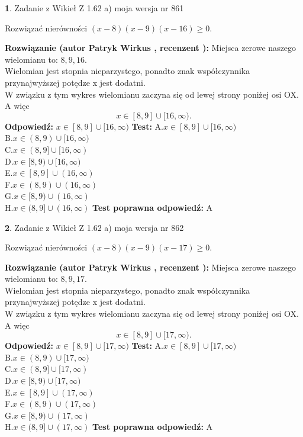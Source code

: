 \documentclass[12pt, a4paper]{article}
\theoremstyle{definition} %
\newtheorem{zad}{}
\newcommand{\zadStart}[1]{\begin{zad}#1\newline}
\newcommand{\zadStop}{\end{zad}}
\newcommand{\rozwStart}[2]{\noindent \textbf{Rozwiązanie (autor #1 , recenzent #2): }\newline}
\newcommand{\rozwStop}{\newline}
\newcommand{\odpStart}{\noindent \textbf{Odpowiedź:}\newline}
\newcommand{\odpStop}{\newline}
\newcommand{\testStart}{\noindent \textbf{Test:}\newline}
\newcommand{\testStop}{\newline}
\newcommand{\kluczStart}{\noindent \textbf{Test poprawna odpowiedź:}\newline}
\newcommand{\kluczStop}{\newline}
\begin{document}
\zadStart{Zadanie z Wikieł Z 1.62 a) moja wersja nr 861}

Rozwiązać nierówności $(x-8)(x-9)(x-16)\ge0$.
\zadStop
\rozwStart{Patryk Wirkus}{}
Miejsca zerowe naszego wielomianu to: $8, 9, 16$.\\
Wielomian jest stopnia nieparzystego, ponadto znak współczynnika przy\linebreak najwyższej potędze x jest dodatni.\\ W związku z tym wykres wielomianu zaczyna się od lewej strony poniżej osi OX. A więc $$x \in [8,9] \cup [16,\infty).$$
\rozwStop
\odpStart
$x \in [8,9] \cup [16,\infty)$
\odpStop
\testStart
A.$x \in [8,9] \cup [16,\infty)$\\
B.$x \in (8,9) \cup [16,\infty)$\\
C.$x \in (8,9] \cup [16,\infty)$\\
D.$x \in [8,9) \cup [16,\infty)$\\
E.$x \in [8,9] \cup (16,\infty)$\\
F.$x \in (8,9) \cup (16,\infty)$\\
G.$x \in [8,9) \cup (16,\infty)$\\
H.$x \in (8,9] \cup (16,\infty)$
\testStop
\kluczStart
A
\kluczStop



\zadStart{Zadanie z Wikieł Z 1.62 a) moja wersja nr 862}

Rozwiązać nierówności $(x-8)(x-9)(x-17)\ge0$.
\zadStop
\rozwStart{Patryk Wirkus}{}
Miejsca zerowe naszego wielomianu to: $8, 9, 17$.\\
Wielomian jest stopnia nieparzystego, ponadto znak współczynnika przy\linebreak najwyższej potędze x jest dodatni.\\ W związku z tym wykres wielomianu zaczyna się od lewej strony poniżej osi OX. A więc $$x \in [8,9] \cup [17,\infty).$$
\rozwStop
\odpStart
$x \in [8,9] \cup [17,\infty)$
\odpStop
\testStart
A.$x \in [8,9] \cup [17,\infty)$\\
B.$x \in (8,9) \cup [17,\infty)$\\
C.$x \in (8,9] \cup [17,\infty)$\\
D.$x \in [8,9) \cup [17,\infty)$\\
E.$x \in [8,9] \cup (17,\infty)$\\
F.$x \in (8,9) \cup (17,\infty)$\\
G.$x \in [8,9) \cup (17,\infty)$\\
H.$x \in (8,9] \cup (17,\infty)$
\testStop
\kluczStart
A
\kluczStop
\end{document}
